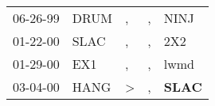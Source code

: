 \begin{supertabular}{p{0.07\textwidth}p{0.06\textwidth}p{0.02\textwidth}p{0.02\textwidth}p{0.06\textwidth}}
 06-26-99\textsuperscript{} &  DRUM\textsuperscript{} &             , &  , &           NINJ\textsuperscript{} \\
 01-22-00\textsuperscript{} &  SLAC\textsuperscript{} &             , &  , &            2X2\textsuperscript{} \\
 01-29-00\textsuperscript{} &   EX1\textsuperscript{} &             , &  , &           lwmd\textsuperscript{} \\
 03-04-00\textsuperscript{} &  HANG\textsuperscript{} &  \textgreater &  , &  \textbf{SLAC\textsuperscript{}} \\
\end{supertabular}
